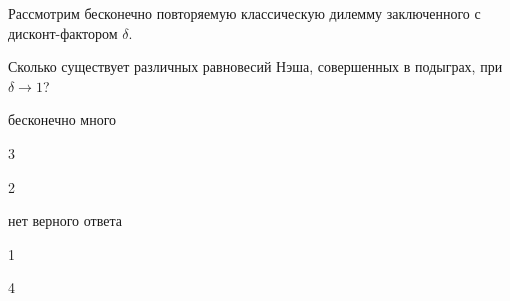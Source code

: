 
\begin{question}
Рассмотрим бесконечно повторяемую классическую дилемму заключенного с
дисконт-фактором \(\delta\).

Сколько существует различных равновесий Нэша, совершенных в подыграх,
при \(\delta \to 1\)?
\begin{answerlist}
  \item бесконечно много
  \item 3
  \item 2
  \item нет верного ответа
  \item 1
  \item 4
\end{answerlist}
\end{question}


